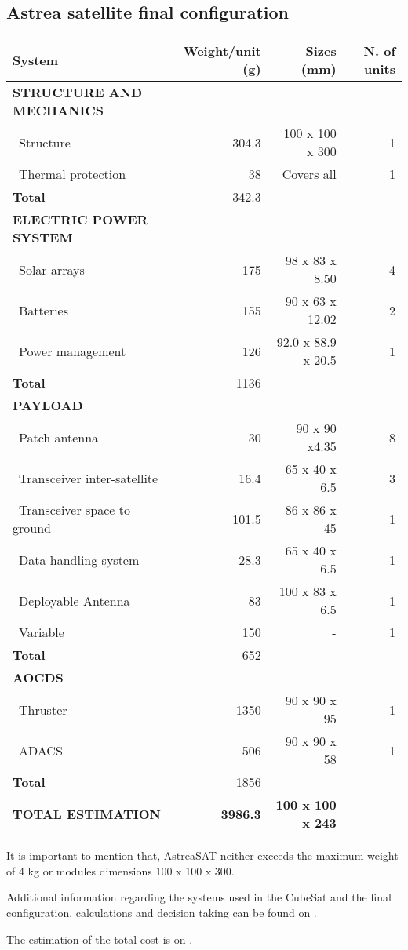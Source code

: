 \subsection{Astrea satellite final configuration}
\begin{longtable}{| l | r | r | r |}
	\hline
	\rowcolor[gray]{0.80}	\textbf{System}& \textbf{Weight/unit (g)} & \textbf{Sizes (mm)} & \textbf{N. of units}\\
	\hline
	\hline
	\endfirsthead
	
	
	\rowcolor[gray]{0.85} \textbf{STRUCTURE AND MECHANICS} & & & \\ \hline
	
	~Structure & 304.3 & 100 x 100 x 300& 1 \\
	~Thermal protection & 38 & Covers all & 1\\
	\hline 
	\rowcolor[gray]{0.95} \textbf{Total} & 342.3 & &  \\
	\hline 
	
	\rowcolor[gray]{0.85} \textbf{ELECTRIC POWER SYSTEM} & & & \\\hline
	
	~Solar arrays & 175 & 98 x 83 x 8.50 & 4 \\
	~Batteries & 155 & 90 x 63 x 12.02 & 2 \\
	~Power management & 126 & 92.0 x 88.9 x 20.5 & 1 \\
	\hline
	\rowcolor[gray]{0.95} \textbf{Total} & 1136 &  &  \\
	\hline \hline
	
	\rowcolor[gray]{0.85} \textbf{PAYLOAD} & & & \\ \hline
	
	~Patch antenna & 30 & 90 x 90 x4.35& 8 \\
	~Transceiver inter-satellite & 16.4 & 65 x 40 x 6.5 & 3 \\
	~Transceiver space to ground & 101.5 & 86 x 86 x 45 & 1 \\
	~Data handling system & 28.3 & 65 x 40 x 6.5 & 1\\
	~Deployable Antenna & 83 & 100 x 83 x 6.5 &1\\
	~Variable & 150 & - & 1\\
	\hline
	\rowcolor[gray]{0.95} \textbf{Total} & 652 &  & \\
	\hline \hline
	
	\rowcolor[gray]{0.85} \textbf{AOCDS} & & &\\ \hline
	
	~Thruster & 1350 & 90 x 90 x 95 & 1 \\
	~ADACS & 506 & 90 x 90 x 58 & 1 \\
	\hline
	\rowcolor[gray]{0.95} \textbf{Total} & 1856 &  & \\
	\hline
	
	\rowcolor[gray]{0.9} \textbf{TOTAL ESTIMATION} & \textbf{3986.3} &\textbf{100 x 100 x 243} & \\ \hline
\end{longtable} 
It is important to mention that, AstreaSAT neither exceeds the maximum weight of 4 kg or modules dimensions 100 x 100 x 300.

Additional information regarding the systems used in the CubeSat and the final configuration, calculations and decision taking can be found on \cite{annex4}.

The estimation of the total cost is on \cite[Chapter 1, Section 7]{annex4}. 